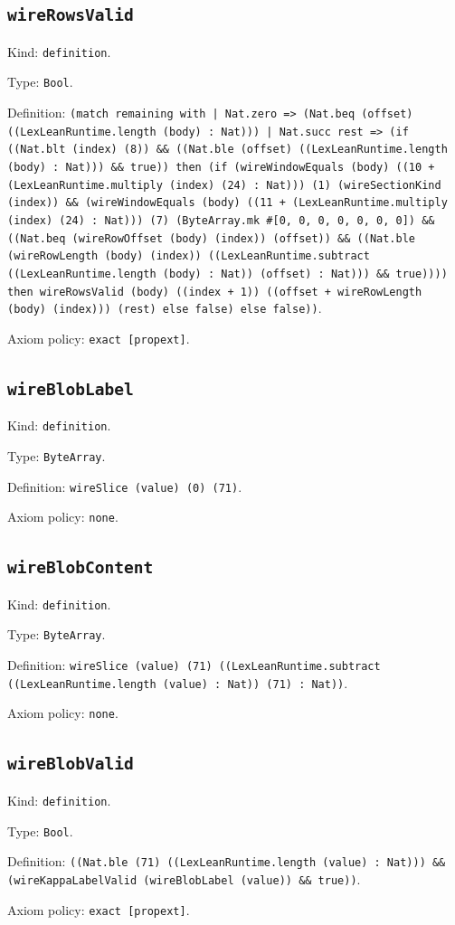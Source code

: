\documentclass[11pt]{article}
\begin{document}
\subsection*{\texttt{wireRowsValid}}
\noindent Kind: \texttt{definition}.\par
\noindent Type: \texttt{Bool}.\par
\noindent Definition: \texttt{(match remaining with | Nat.zero => (Nat.beq (offset) ((LexLeanRuntime.length (body) : Nat))) | Nat.succ rest => (if ((Nat.blt (index) (8)) \&\& ((Nat.ble (offset) ((LexLeanRuntime.length (body) : Nat))) \&\& true)) then (if (wireWindowEquals (body) ((10 + (LexLeanRuntime.multiply (index) (24) : Nat))) (1) (wireSectionKind (index)) \&\& (wireWindowEquals (body) ((11 + (LexLeanRuntime.multiply (index) (24) : Nat))) (7) (ByteArray.mk \#[0, 0, 0, 0, 0, 0, 0]) \&\& ((Nat.beq (wireRowOffset (body) (index)) (offset)) \&\& ((Nat.ble (wireRowLength (body) (index)) ((LexLeanRuntime.subtract ((LexLeanRuntime.length (body) : Nat)) (offset) : Nat))) \&\& true)))) then wireRowsValid (body) ((index + 1)) ((offset + wireRowLength (body) (index))) (rest) else false) else false))}.\par
\noindent Axiom policy: \texttt{exact [propext]}.\par
\subsection*{\texttt{wireBlobLabel}}
\noindent Kind: \texttt{definition}.\par
\noindent Type: \texttt{ByteArray}.\par
\noindent Definition: \texttt{wireSlice (value) (0) (71)}.\par
\noindent Axiom policy: \texttt{none}.\par
\subsection*{\texttt{wireBlobContent}}
\noindent Kind: \texttt{definition}.\par
\noindent Type: \texttt{ByteArray}.\par
\noindent Definition: \texttt{wireSlice (value) (71) ((LexLeanRuntime.subtract ((LexLeanRuntime.length (value) : Nat)) (71) : Nat))}.\par
\noindent Axiom policy: \texttt{none}.\par
\subsection*{\texttt{wireBlobValid}}
\noindent Kind: \texttt{definition}.\par
\noindent Type: \texttt{Bool}.\par
\noindent Definition: \texttt{((Nat.ble (71) ((LexLeanRuntime.length (value) : Nat))) \&\& (wireKappaLabelValid (wireBlobLabel (value)) \&\& true))}.\par
\noindent Axiom policy: \texttt{exact [propext]}.\par
\end{document}
